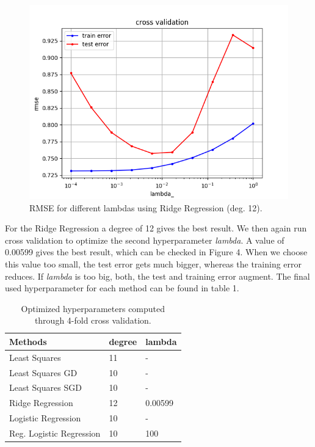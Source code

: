 \documentclass[10pt,conference,compsocconf]{IEEEtran}
\begin{document}
\begin{figure}[htbp]
	\centering
	\includegraphics[width=\columnwidth]{cross_validation_ridge_degree_12.png}
	\caption{RMSE for different lambdas using Ridge Regression (deg. 12).}
	\vspace{-3mm}
	\label{fig:crossvalidationridge}
\end{figure}
 For the Ridge Regression a degree of 12 gives the best result. We then again run cross validation to optimize the second hyperparameter \textit{lambda}. A value of 0.00599 gives the best result, which can be checked in Figure 4. When we choose this value too small, the test error gets much bigger, whereas the training error reduces. If \textit{lambda} is too big, both, the test and training error augment.
 The final used hyperparameter for each method can be found in table 1.\\


\begin{table}[htbp]
	\centering
	\begin{tabular}[c]{|l||l|l|}
		\hline
		Methods&degree&lambda\\
		\hline
		Least Squares& 11 &-\\
		Least Squares GD& 10 & -\\
		Least Squares SGD & 10 &-\\		Ridge Regression&12&0.00599\\
		Logistic Regression & 10&-\\
		Reg. Logistic Regression&10&100\\
		\hline
	\end{tabular}
	\caption{Optimized hyperparameters computed\\ through 4-fold cross validation.}
	\label{tab:hyperpam}
\end{table}
\end{document}

